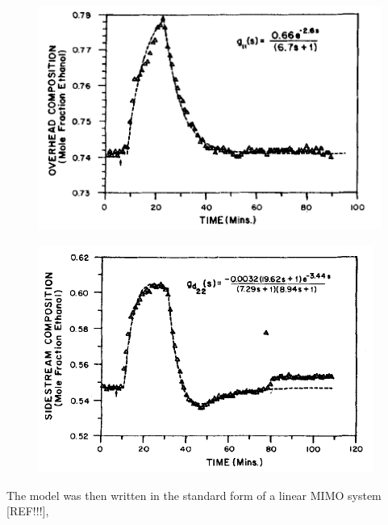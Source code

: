 \begin{figure}[htbp]
	\centering
	\begin{minipage}{.48\textwidth}
		\centering
		\includegraphics[width=\linewidth]{Figures/Pulse_test_1}
		\label{fig:test1}
	\end{minipage}%
	\hfill
	\begin{minipage}{.48\textwidth}
		\centering
		\includegraphics[width=\linewidth]{Figures/Pulse_test_2}
		\label{fig:test2}
	\end{minipage}
\end{figure}

The model was then written in the standard form of a linear MIMO system [REF!!!],

